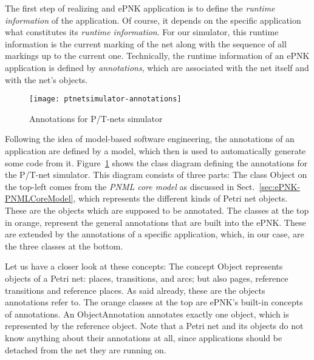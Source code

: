The first step of realizing and ePNK application is to define the
\emph{runtime information} of the application. Of course, it depends on
the specific application what constitutes its \emph{runtime information}.
For our simulator, this runtime information is the current marking of the
net along with the sequence of all markings up to the current one. Technically,
the runtime information of an ePNK application is defined by \emph{annotations},
which are associated with the net itself and with the net's objects.

\begin{figure}[hbt!!]
  \centerline{\texttt{[image: ptnetsimulator-annotations]}}
  \caption{Annotations for P/T-nets simulator}
  \label{fig:developer:application:annotations:ptsimanno}
\end{figure}

Following the idea of model-based software engineering, the annotations of
an application are defined by a model, which then is used to automatically
generate some code from it.
Figure~\ref{fig:developer:application:annotations:ptsimanno} shows the
class diagram defining the annotations for the P/T-net simulator. This diagram
consists of three parts: The class {\sf Object} on the top-left comes from
the \emph{PNML core model} as discussed in Sect.~\ref{sec:ePNK-PNMLCoreModel},
which represents the different kinds of Petri net objects. These are
the objects which are supposed to be annotated. The classes at the top
in orange, represent the general annotations that are built into
the ePNK. These are extended by the annotations of a specific application,
which, in our case, are the three classes at the bottom.

Let us have a closer look at these concepts: The concept {\sf Object} represents
{objects} of a Petri net: places,
transitions, and arcs; but also pages, reference transitions and reference
places. As said already, these are the objects annotations refer to.
The orange classes at the top are ePNK's built-in concepts of annotations.
An {\sf ObjectAnnotation} annotates exactly one object, which is
represented by the reference {\sf object}. Note that
a Petri net and its objects do not know anything about their annotations
at all, since applications should be detached from the net they are running
on. 

